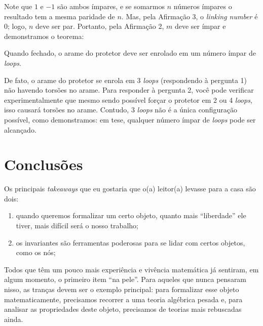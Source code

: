 	\par\vspace{0.3cm} Note que $1$ e $-1$ são ambos ímpares, e se somarmos $n$ números ímpares o resultado 
	tem a mesma paridade de $n$. Mas, pela Afirmação 3, o \textit{linking number} é $0$; logo, $n$ deve ser par.
	Portanto, pela Afirmação 2, $m$ deve ser ímpar e demonstramos o teorema:
	\begin{theorem}
	\label{teorema protetor de para-brisa}
		Quando fechado, o arame do protetor deve ser enrolado em um número ímpar de \textit{loops}.
	\end{theorem}  
	\par\vspace{0.3cm} De fato, o arame do protetor se enrola em 3 \textit{loops} (respondendo à pergunta 1) 
	não havendo torsões no arame. Para responder à pergunta 2, você pode verificar experimentalmente que 
	mesmo sendo possível forçar o protetor em 2 ou 4 \textit{loops}, isso causará torsões no arame. Contudo, 
	$3$ \textit{loops} não é a única configuração possível, como demonstramos: em tese, qualquer número 
	ímpar de \textit{loops} pode ser alcançado.
\section{Conclusões}
    Os principais {\it takeaways} que eu gostaria que o(a) leitor(a) levasse para a casa são dois:
    \begin{enumerate}
        \item quando queremos formalizar um certo objeto, quanto mais ``liberdade'' ele tiver, mais difícil
        será o nosso trabalho;
        \item os invariantes são ferramentas poderosas para se lidar com certos objetos, como os nós;
    \end{enumerate}
    \par\vspace{0.3cm} Todos que têm um pouco mais experiência e vivência matemática já sentiram, 
    em algum momento, o primeiro item ``na pele''. Para aqueles que nunca pensaram nisso, as tranças 
    devem ser o exemplo principal:
    para formalizar esse objeto matematicamente, precisamos recorrer a uma teoria algébrica pesada e, 
    para analisar as propriedades deste objeto, precisamos de teorias mais rebuscadas ainda.
    
